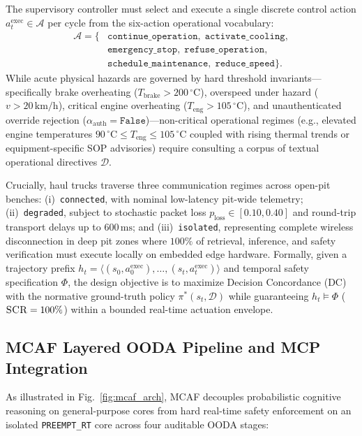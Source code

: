 \documentclass{ieeeaccess}
\begin{document}
The supervisory controller must select and execute a single discrete control action $a_t^{\mathrm{exec}} \in \mathcal{A}$ per cycle from the six-action operational vocabulary:
\begin{align}
    \mathcal{A} = \{&\texttt{continue\_operation},\; \texttt{activate\_cooling}, \nonumber\\
                    &\texttt{emergency\_stop},\; \texttt{refuse\_operation}, \nonumber\\
                    &\texttt{schedule\_maintenance},\; \texttt{reduce\_speed}\}.
    \label{eq:action_space}
\end{align}
While acute physical hazards are governed by hard threshold invariants---specifically brake overheating ($T_{\mathrm{brake}} > 200\,^\circ\text{C}$), overspeed under hazard ($v > 20\,\text{km/h}$), critical engine overheating ($T_{\mathrm{eng}} > 105\,^\circ\text{C}$), and unauthenticated override rejection ($\alpha_{\mathrm{auth}} = \texttt{False}$)---non-critical operational regimes (e.g., elevated engine temperatures $90\,^\circ\text{C} \le T_{\mathrm{eng}} \le 105\,^\circ\text{C}$ coupled with rising thermal trends or equipment-specific SOP advisories) require consulting a corpus of textual operational directives $\mathcal{D}$.

Crucially, haul trucks traverse three communication regimes across open-pit benches: (i)~\texttt{connected}, with nominal low-latency pit-wide telemetry; (ii)~\texttt{degraded}, subject to stochastic packet loss $p_{\mathrm{loss}} \in [0.10, 0.40]$ and round-trip transport delays up to $600\,\text{ms}$; and (iii)~\texttt{isolated}, representing complete wireless disconnection in deep pit zones where $100\%$ of retrieval, inference, and safety verification must execute locally on embedded edge hardware. Formally, given a trajectory prefix $h_t = \langle (s_0, a_0^{\mathrm{exec}}), \dots, (s_t, a_t^{\mathrm{exec}}) \rangle$ and temporal safety specification $\Phi$, the design objective is to maximize Decision Concordance (\textsc{DC}) with the normative ground-truth policy $\pi^*(s_t, \mathcal{D})$ while guaranteeing $h_t \models \Phi$ ($\textsc{SCR} = 100\%$) within a bounded real-time actuation envelope.

\subsection{MCAF Layered OODA Pipeline and MCP Integration}
As illustrated in Fig.~\ref{fig:mcaf_arch}, MCAF decouples probabilistic cognitive reasoning on general-purpose cores from hard real-time safety enforcement on an isolated \texttt{PREEMPT\_RT} core across four auditable OODA stages:
\end{document}
